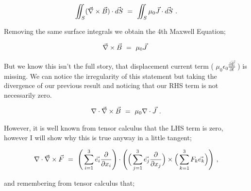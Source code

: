 \documentclass{article}
\begin{document}
\begin{equation} \label{eb-eq-51-19}
\iint_{S} (\vec{\nabla}\times\vec{B})\cdot\vec{dS} \hspace{0.125cm} = \hspace{0.125cm} \iint_{S} \mu_{0} \vec{J}\cdot\vec{dS} \hspace{0.125cm} .
\end{equation}

Removing the same surface integrals we obtain the 4th Maxwell Equation;

\begin{equation} \label{eb-eq-51-20}
\vec{\nabla} \times \vec{B} \hspace{0.125cm} = \hspace{0.125cm} \mu_{0} \vec{J} \hspace{0.125cm}
\end{equation}

But we know this isn't the full story, that displacement current term ( \begin{math} \mu_{0} \epsilon_{0} \frac{\partial{\vec{E}}}{\partial{t}} \end{math} ) is missing. We can notice the irregularity of this statement but taking the divergence of our previous result and noticing that our RHS term is not necessarily zero.

\begin{equation} \label{eb-eq-51-21}
\nabla\cdot\vec{\nabla} \times \vec{B} \hspace{0.125cm} = \hspace{0.125cm} \mu_{0} \nabla\cdot\vec{J} \hspace{0.125cm} .
\end{equation}

However, it is well known from tensor calculus that the LHS term is zero, however I will show why this is true anyway in a little tangent; 

\begin{equation} \label{eb-eq-51-22}
\nabla\cdot\vec{\nabla} \times \vec{F} \hspace{0.125cm} = \hspace{0.125cm} \Bigg( \sum_{i=1}^{3} \vec{e_{i}} \frac{\partial}{\partial x_i} \Bigg)\cdot\Bigg( \Big( \sum_{j=1}^{3} \vec{e_j} \frac{\partial}{\partial x_j} \Big)\times\Big( \sum_{k=1}^{3} F_k \vec{e_k}\Big) \Bigg) \hspace{0.125cm} ,
\end{equation}

and remembering from tensor calculus that;
\end{document}
